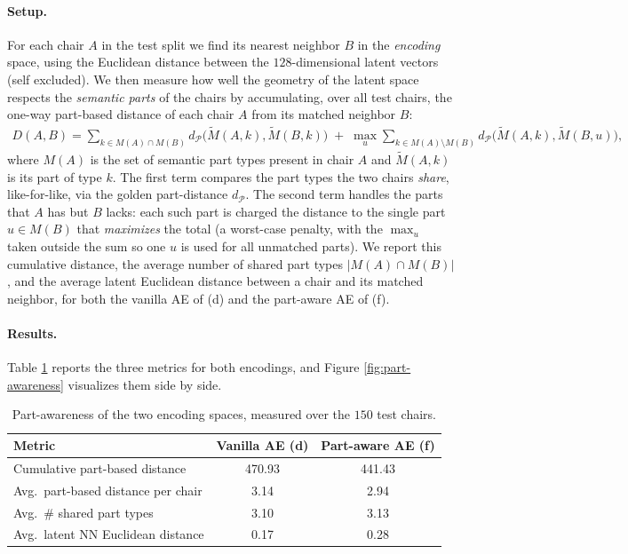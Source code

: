 \documentclass{article}
\begin{document}
\paragraph{Setup.} For each chair $A$ in the test split we find its nearest neighbor $B$ in the
\emph{encoding} space, using the Euclidean distance between the $128$-dimensional latent vectors
(self excluded). We then measure how well the geometry of the latent space respects the
\emph{semantic parts} of the chairs by accumulating, over all test chairs, the one-way part-based
distance of each chair $A$ from its matched neighbor $B$:
\begin{align*}
    D(A,B) = \sum_{k\in M(A)\cap M(B)} d_{\mathscr{P}}\big(\tilde{M}(A,k),\tilde{M}(B,k)\big)
           \;+\; \max_{u}\sum_{k\in M(A)\setminus M(B)} d_{\mathscr{P}}\big(\tilde{M}(A,k),\tilde{M}(B,u)\big),
\end{align*}
where $M(A)$ is the set of semantic part types present in chair $A$ and $\tilde{M}(A,k)$ is its part
of type $k$. The first term compares the part types the two chairs \emph{share}, like-for-like, via
the golden part-distance $d_{\mathscr{P}}$. The second term handles the parts that $A$ has but $B$ lacks:
each such part is charged the distance to the single part $u\in M(B)$ that \emph{maximizes} the total
(a worst-case penalty, with the $\max_u$ taken outside the sum so one $u$ is used for all unmatched parts).
We report this cumulative distance, the average number of shared part types $|M(A)\cap M(B)|$, and the
average latent Euclidean distance between a chair and its matched neighbor, for both the vanilla AE of (d)
and the part-aware AE of (f).

\paragraph{Results.} Table \ref{tab:part-awareness} reports the three metrics for both encodings, and Figure \ref{fig:part-awareness} visualizes them side by side.
\begin{table}[h!]
    \centering
    \begin{tabular}{lcc}
        \hline
        Metric & Vanilla AE (d) & Part-aware AE (f) \\
        \hline
        Cumulative part-based distance        & 470.93 & 441.43 \\
        Avg.\ part-based distance per chair    & 3.14   & 2.94   \\
        Avg.\ \# shared part types             & 3.10   & 3.13   \\
        Avg.\ latent NN Euclidean distance     & 0.17   & 0.28   \\
        \hline
    \end{tabular}
    \caption{Part-awareness of the two encoding spaces, measured over the $150$ test chairs.}
    \label{tab:part-awareness}
\end{table}
\end{document}
